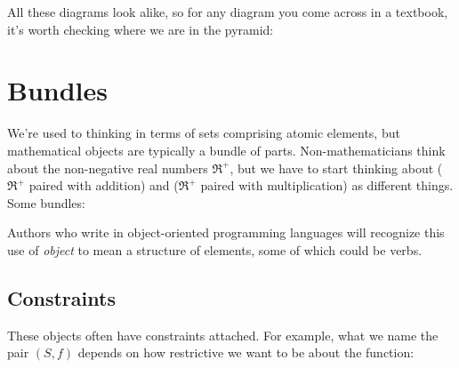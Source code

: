 \documentclass[11pt]{article}
\begin{document}
All these diagrams look alike, so for any diagram you come across in a textbook, it's
worth checking where we are in the pyramid:

\section{Bundles}\label{bundlesec}
We're used to thinking in terms of sets comprising atomic elements, but mathematical
objects are typically a bundle of parts. Non-mathematicians think about the non-negative real numbers
$\Re^+$, but we have to start thinking about ($\Re^+$ paired with addition) and ($\Re^+$
paired with multiplication) as different things. Some bundles:


Authors who write in object-oriented programming languages will recognize this
use of {\em object} to mean a structure of elements, some of which could be verbs.

\subsection{Constraints}
These objects often have constraints attached. For example, what we name the pair $(S, f)$ depends on
how restrictive we want to be about the function:
\end{document}
